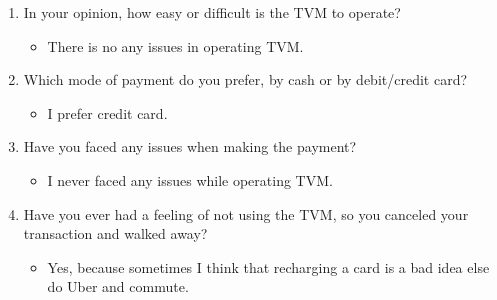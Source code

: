 \documentclass[15pt]{article}
\begin{document}
\begin{appendices}
\begin{enumerate}[leftmargin=3em, itemsep=0pt, parsep=0pt, , font=\Large\bfseries]
\begin{enumerate}[leftmargin=2em, itemsep=0pt, parsep=0pt, , font=\Large\bfseries]
\begin{itemize}
            \end{itemize}
            \vspace{0.2cm}
        \item {\Large In your opinion, how easy or difficult is the TVM to operate?}
        \vspace{0.1cm}
            \begin{itemize}
                \item {\Large There is no any issues in operating TVM.}
            \end{itemize}
            \vspace{0.2cm}
        \item {\Large Which mode of payment do you prefer, by cash or by debit/credit card?}
            \begin{itemize}
                \item {\Large I prefer credit card.}
            \end{itemize}
            \vspace{0.2cm}
        \item {\Large Have you faced any issues when making the payment?}
        \vspace{0.1cm}
            \begin{itemize}
                \item {\Large I never faced any issues while operating TVM.}
            \end{itemize}
            \vspace{0.2cm}
        \item {\Large Have you ever had a feeling of not using the TVM, so you canceled your transaction and walked away?}
        \vspace{0.1cm}
            \begin{itemize}
                \item {\Large Yes, because sometimes I think that recharging a card is a bad idea else do Uber and commute.}
            \end{itemize}
            \vspace{0.2cm}
    \end{enumerate}
    
\end{enumerate}
\end{appendices}



\end{document}
